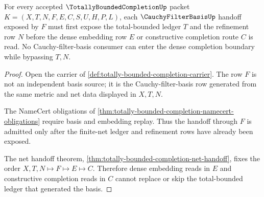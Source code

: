 \begin{theorem}
\label{thm:totally-bounded-completion-cauchy-filter-basis-handoff}
For every accepted $\TotallyBoundedCompletionUp$ packet $K=(X,T,N,F,E,C,S,U,H,P,L)$, each $\CauchyFilterBasisUp$ handoff exposed by $F$ must first expose the total-bounded ledger $T$ and the refinement row $N$ before the dense embedding row $E$ or constructive completion route $C$ is read. No Cauchy-filter-basis consumer can enter the dense completion boundary while bypassing $T,N$.
\end{theorem}
\begin{proof}
Open the carrier of \autoref{def:totally-bounded-completion-carrier}. The row $F$ is not an independent basis source; it is the Cauchy-filter-basis row generated from the same metric and net data displayed in $X,T,N$.

The NameCert obligations of \autoref{thm:totally-bounded-completion-namecert-obligations} require basis and embedding replay. Thus the handoff through $F$ is admitted only after the finite-net ledger and refinement rows have already been exposed.

The net handoff theorem, \autoref{thm:totally-bounded-completion-net-handoff}, fixes the order $X,T,N \longmapsto F \longmapsto E \longmapsto C$. Therefore dense embedding reads in $E$ and constructive completion reads in $C$ cannot replace or skip the total-bounded ledger that generated the basis.
\end{proof}

